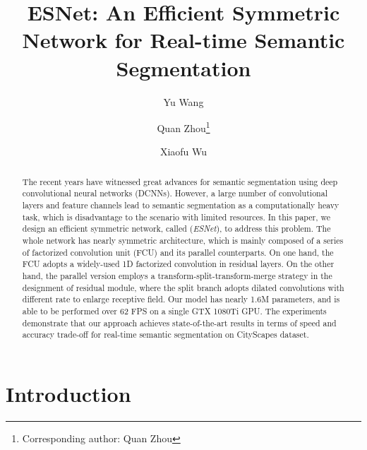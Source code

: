 \documentclass[runningheads]{llncs}
\begin{document}
\title{ESNet: An Efficient Symmetric Network for Real-time Semantic Segmentation}
\author{
Yu Wang\inst{} \and
Quan Zhou\inst{}\thanks{Corresponding author: Quan Zhou} \and
Xiaofu Wu\inst{}
}

\maketitle              \begin{abstract}

The recent years have witnessed great advances for semantic segmentation using deep convolutional neural networks (DCNNs). However, a large number of convolutional layers and feature channels lead to semantic segmentation as a computationally heavy task, which is disadvantage to the scenario with limited resources. In this paper, we design an efficient symmetric network, called (\emph{ESNet}), to address this problem. The whole network has nearly symmetric architecture, which is mainly composed of a series of factorized convolution unit (FCU) and its parallel counterparts. On one hand, the FCU adopts a widely-used 1D factorized convolution in residual layers. On the other hand, the parallel version employs a transform-split-transform-merge strategy in the designment of residual module, where the split branch adopts dilated convolutions with different rate to enlarge receptive field. Our model has nearly 1.6M parameters, and is able to be performed over 62 FPS on a single GTX 1080Ti GPU. The experiments demonstrate that our approach achieves state-of-the-art results in terms of speed and accuracy trade-off for real-time semantic segmentation on CityScapes dataset.

\end{abstract}


\section{Introduction}
\end{document}
